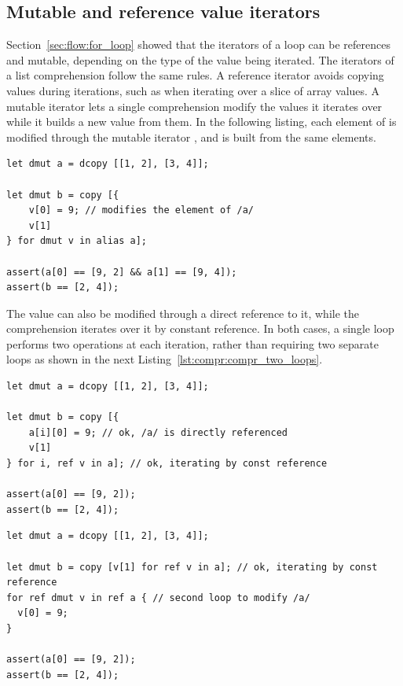 \subsection{Mutable and reference value iterators}

Section~\ref{sec:flow:for_loop} showed that the iterators of a  loop can be
references and mutable, depending on the type of the value being iterated. The
iterators of a list comprehension follow the same rules. A reference iterator
avoids copying values during iterations, such as when iterating over a slice of
array values. A mutable iterator lets a single comprehension modify the values
it iterates over while it builds a new value from them. In the following
listing, each element of  is modified through the mutable iterator
, and  is built from the same elements.

\begin{lstlisting}[style=coloredverbatim, caption=Mutable iterator in a list comprehension]
let dmut a = dcopy [[1, 2], [3, 4]];

let dmut b = copy [{
    v[0] = 9; // modifies the element of /a/
    v[1]
} for dmut v in alias a];

assert(a[0] == [9, 2] && a[1] == [9, 4]);
assert(b == [2, 4]);
\end{lstlisting}

The value  can also be modified through a direct reference to it,
while the comprehension iterates over it by constant reference. In both cases, a
single loop performs two operations at each iteration, rather than requiring two
separate loops as shown in the next Listing~\ref{lst:compr:compr_two_loops}.

\begin{lstlisting}[style=coloredverbatim, caption=Modify existing value during list comprehension]
let dmut a = dcopy [[1, 2], [3, 4]];

let dmut b = copy [{
    a[i][0] = 9; // ok, /a/ is directly referenced
    v[1]
} for i, ref v in a]; // ok, iterating by const reference

assert(a[0] == [9, 2]);
assert(b == [2, 4]);
\end{lstlisting}

\begin{lstlisting}[style=coloredverbatim, caption=Using two loops, label=lst:compr:compr_two_loops]
let dmut a = dcopy [[1, 2], [3, 4]];

let dmut b = copy [v[1] for ref v in a]; // ok, iterating by const reference
for ref dmut v in ref a { // second loop to modify /a/
  v[0] = 9;
}

assert(a[0] == [9, 2]);
assert(b == [2, 4]);
\end{lstlisting}

